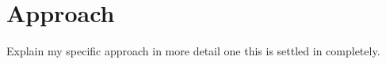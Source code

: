 






\section{Approach}

Explain my specific approach in more detail one this is settled in completely. 




